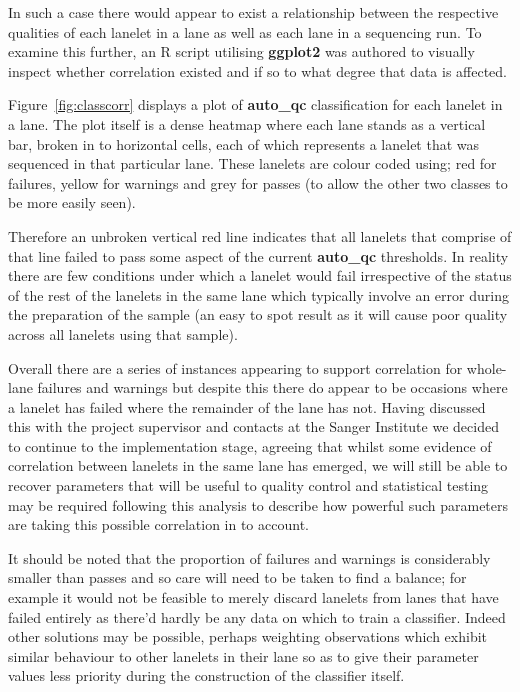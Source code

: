 In such a case there would appear to exist a relationship between the respective
qualities of each lanelet in a lane as well as each lane in a sequencing run. To
examine this further, an R script utilising \textbf{ggplot2} was authored to
visually inspect whether correlation existed and if so to what degree that data
is affected.

Figure~\ref{fig:classcorr} displays a plot of \textbf{auto\_qc} classification
for each lanelet in a lane. The plot itself is a dense heatmap
where each lane stands as a vertical bar, broken in to horizontal cells, each
of which represents a lanelet that was sequenced in that particular lane. These
lanelets are colour coded using; red for failures, yellow for warnings and grey
for passes (to allow the other two classes to be more easily seen).

Therefore an unbroken vertical red line indicates that all lanelets that
comprise of that line failed to pass some aspect of the current
\textbf{auto\_qc} thresholds. In reality there are few conditions under which
a lanelet would fail irrespective of the status of the rest of the lanelets in
the same lane which typically involve an error during the preparation of the
sample (an easy to spot result as it will cause poor quality across all lanelets
using that sample).

Overall there are a series of instances appearing to support correlation for
whole-lane failures and warnings but despite this there do appear to be occasions
where a lanelet has failed where the remainder of the lane has not.
Having discussed this with the project supervisor and contacts at the Sanger Institute we decided to continue to
the implementation stage, agreeing that whilst some evidence of correlation
between lanelets in the same lane has emerged, we will still be able to recover
parameters that will be useful to quality control and statistical testing may be
required following this analysis to describe how powerful such parameters are
taking this possible correlation in to account.

It should be
noted that the proportion of failures and warnings is considerably smaller than
passes and so care will need to be taken to find a balance; for example it would
not be feasible to merely discard lanelets from lanes that have failed entirely
as there'd hardly be any data on which to train a classifier. Indeed other
solutions may be possible, perhaps weighting observations which exhibit similar
behaviour to other lanelets in their lane so as to give their parameter values
less priority during the construction of the classifier itself.

